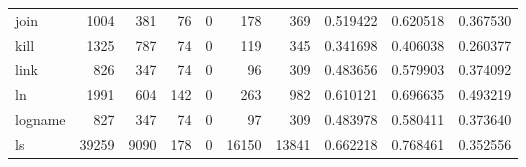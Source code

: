 \begin{longtable}{lrrrrrrrrr}
join      &                                1004 &                                             381 &                                             76 &                                             0 &                                            178 &                                          369 &                                           0.519422 &                               0.620518 &                             0.367530 \\
kill      &                                1325 &                                             787 &                                             74 &                                             0 &                                            119 &                                          345 &                                           0.341698 &                               0.406038 &                             0.260377 \\
link      &                                 826 &                                             347 &                                             74 &                                             0 &                                             96 &                                          309 &                                           0.483656 &                               0.579903 &                             0.374092 \\
ln        &                                1991 &                                             604 &                                            142 &                                             0 &                                            263 &                                          982 &                                           0.610121 &                               0.696635 &                             0.493219 \\
logname   &                                 827 &                                             347 &                                             74 &                                             0 &                                             97 &                                          309 &                                           0.483978 &                               0.580411 &                             0.373640 \\
ls        &                               39259 &                                            9090 &                                            178 &                                             0 &                                          16150 &                                        13841 &                                           0.662218 &                               0.768461 &                             0.352556 \\

\end{longtable}
